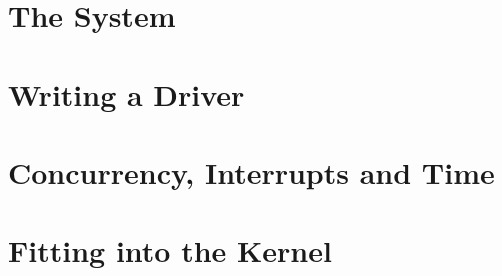 \documentclass[10pt, twoside, openright]{book}
\begin{document}
\frontmatter

\tableofcontents


\mainmatter
\part{The System}




\part{Writing a Driver}




\part{Concurrency, Interrupts and Time}




\part{Fitting into the Kernel}




\appendix






\end{document}
